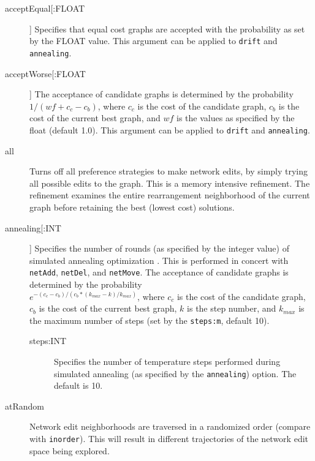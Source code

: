 	\begin{description}
		\item[acceptEqual[:FLOAT]] Specifies that equal cost graphs are accepted with the
		probability as set by the FLOAT value. This argument can be applied to \texttt{drift}
		and \texttt{annealing}.
			
		\item[acceptWorse[:FLOAT]] The acceptance of candidate graphs is determined by the 
		probability $1/ (wf + c_c - c_b)$, where $c_c$ is the cost of the candidate graph, $c_b$ 
		is the cost of the current best graph, and $wf$ is the values as specified by the float 
		(default 1.0). This argument can be applied to \texttt{drift} 	and \texttt{annealing}.
	

		\item[all] Turns off all preference strategies to make network edits, by simply trying 
		all possible edits to the graph. This is a memory intensive refinement.
		The refinement examines the entire rearrangement neighborhood of the current graph 
		before retaining the best (lowest cost) solutions.

		\item[annealing[:INT]] Specifies the number of rounds (as specified by the integer 
		value) of simulated annealing optimization \citep{Metropolisetal1953, 
		Kirkpatricketal1983, Cerny1985}. This is performed in concert with \texttt{netAdd}, 
		\texttt{netDel}, and \texttt{netMove}. The acceptance of candidate graphs is 
		determined by the probability\\ $e ^ {- (c_c - c_b)/ (c_b * (k_{max} -k)/ k_{max})}$, 
		where $c_c$ is the cost of the candidate graph, $c_b$ is the cost of the current 
		best graph, $k$ is the step number, and $k_{max}$ is the maximum number of 
		steps (set by the \texttt{steps:m}, default 10).

			\begin{description}
			\item[steps:INT] Specifies the number of temperature steps performed 
			during simulated annealing (as specified by the \texttt{annealing}) option.
			The default is 10.
			\end{description}
			
		\item[atRandom] Network edit neighborhoods are traversed in a randomized order (compare 
		with \texttt{inorder}). 	This will result in different trajectories of the network edit space being 
		explored.


\end{description}
